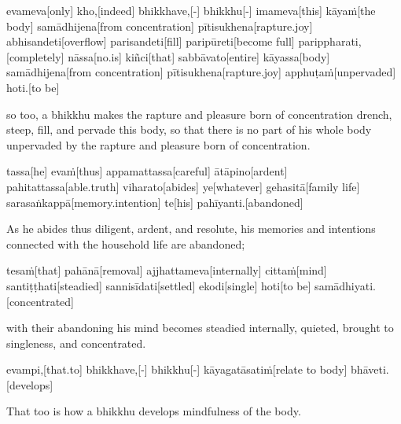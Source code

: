 \begin{samepage}
\begingl[glneveryline={\PaliGlossA,\PaliGlossB}]
evameva[only] kho,[indeed] bhikkhave,[-] bhikkhu[-] imameva[this] kāyaṁ[the body] samādhijena[from concentration] pītisukhena[rapture.joy] abhisandeti[overflow] parisandeti[fill] paripūreti[become full] parippharati,[completely] nāssa[no.is] kiñci[that] sabbāvato[entire] kāyassa[body] samādhijena[from concentration] pītisukhena[rapture.joy] apphuṭaṁ[unpervaded] hoti.[to be]
\endgl
\nopagebreak
\linespread{0.5}
\begin{spacin}{0.2}
{\PaliGlossFT so too, a bhikkhu makes the rapture and pleasure born of concentration drench, steep, fill, and pervade this body, so that there is no part of his whole body unpervaded by the rapture and pleasure born of concentration.}
\end{spacin}
\vskip 12pt
\end{samepage}
\begin{samepage}
\begingl[glneveryline={\PaliGlossA,\PaliGlossB}]
tassa[he] evaṁ[thus] appamattassa[careful] ātāpino[ardent] pahitattassa[able.truth] viharato[abides] ye[whatever] gehasitā[family life] sarasaṅkappā[memory.intention] te[his] pahīyanti.[abandoned]
\endgl
\nopagebreak
\linespread{0.5}
\begin{spacin}{0.2}
{\PaliGlossFT As he abides thus diligent, ardent, and resolute, his memories and intentions connected with the household life are abandoned;}
\end{spacin}
\vskip 12pt
\end{samepage}
\begin{samepage}
\begingl[glneveryline={\PaliGlossA,\PaliGlossB}]
tesaṁ[that] pahānā[removal] ajjhattameva[internally] cittaṁ[mind] santiṭṭhati[steadied] sannisīdati[settled] ekodi[single] hoti[to be] samādhiyati.[concentrated]
\endgl
\nopagebreak
\linespread{0.5}
\begin{spacin}{0.2}
{\PaliGlossFT with their abandoning his mind becomes steadied internally, quieted, brought to singleness, and concentrated.}
\end{spacin}
\vskip 12pt
\end{samepage}
\begin{samepage}
\begingl[glneveryline={\PaliGlossA,\PaliGlossB}]
evampi,[that.to] bhikkhave,[-] bhikkhu[-] kāyagatāsatiṁ[relate to body] bhāveti.[develops]
\endgl
\nopagebreak
\linespread{0.5}
\begin{spacin}{0.2}
{\PaliGlossFT That too is how a bhikkhu develops mindfulness of the body.}
\end{spacin}
\vskip 12pt
\end{samepage}
